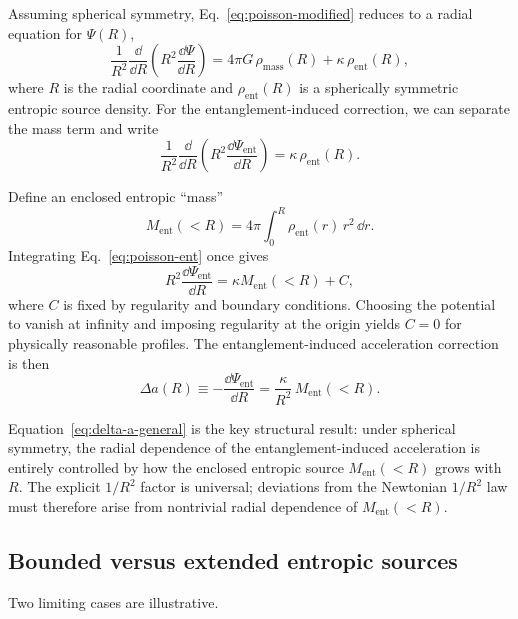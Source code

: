 \documentclass[11pt]{article}
\begin{document}
Assuming spherical symmetry, Eq.~\eqref{eq:poisson-modified} reduces to a radial equation for $\Psi(R)$,
\begin{equation}
 \frac{1}{R^2}\frac{\dd}{\dd R}\!\left(R^2 \frac{\dd\Psi}{\dd R}\right)
 = 4\pi G\,\rho_{\text{mass}}(R) + \kappa\,\rho_{\text{ent}}(R),
 \label{eq:radial-poisson}
\end{equation}
where $R$ is the radial coordinate and $\rho_{\text{ent}}(R)$ is a spherically symmetric entropic source density. For the entanglement-induced correction, we can separate the mass term and write
\begin{equation}
 \frac{1}{R^2}\frac{\dd}{\dd R}\!\left(R^2 \frac{\dd\Psi_{\text{ent}}}{\dd R}\right)
 = \kappa\,\rho_{\text{ent}}(R).
 \label{eq:poisson-ent}
\end{equation}

Define an enclosed entropic ``mass''
\begin{equation}
 M_{\text{ent}}(<R) = 4\pi \int_0^R \rho_{\text{ent}}(r)\,r^2\,\dd r.
 \label{eq:ment}
\end{equation}
Integrating Eq.~\eqref{eq:poisson-ent} once gives
\begin{equation}
 R^2 \frac{\dd\Psi_{\text{ent}}}{\dd R} = \kappa M_{\text{ent}}(<R) + C,
\end{equation}
where $C$ is fixed by regularity and boundary conditions. Choosing the potential to vanish at infinity and imposing regularity at the origin yields $C=0$ for physically reasonable profiles. The entanglement-induced acceleration correction is then
\begin{equation}
 \Delta a(R) \equiv -\frac{\dd\Psi_{\text{ent}}}{\dd R} = \frac{\kappa}{R^2}\,M_{\text{ent}}(<R).
 \label{eq:delta-a-general}
\end{equation}

Equation~\eqref{eq:delta-a-general} is the key structural result: under spherical symmetry, the radial dependence of the entanglement-induced acceleration is entirely controlled by how the enclosed entropic source $M_{\text{ent}}(<R)$ grows with $R$. The explicit $1/R^2$ factor is universal; deviations from the Newtonian $1/R^2$ law must therefore arise from nontrivial radial dependence of $M_{\text{ent}}(<R)$.

\subsection{Bounded versus extended entropic sources}

Two limiting cases are illustrative.
\end{document}
